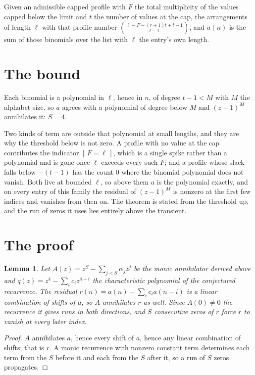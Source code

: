 \documentclass[11pt,a4paper]{article}
\theoremstyle{plain}
\newtheorem{lemma}[theorem]{Lemma}
\theoremstyle{definition}
\begin{document}
Given an admissible capped profile with $F$ the total multiplicity of the values capped below
the limit and $t$ the number of values at the cap, the arrangements of length $\ell$ with that
profile number $\binom{\ell-F-(r+1)t+t-1}{t-1}$, and $a(n)$ is the sum of those binomials
over the list with $\ell$ the entry's own length.

\section{The bound}

Each binomial is a polynomial in $\ell$, hence in $n$, of degree $t-1<M$ with $M$ the alphabet
size, so $a$ agrees with a polynomial of degree below $M$ and $(z-1)^{M}$ annihilates it:
$S=4$.

Two kinds of term are outside that polynomial at small lengths, and they are why the threshold
below is not zero. A profile with no value at the cap contributes the indicator
$[\,F=\ell\,]$, which is a single spike rather than a polynomial and is gone once
$\ell$ exceeds every such $F$; and a profile whose slack falls below $-(t-1)$ has the count
$0$ where the binomial polynomial does not vanish. Both live at bounded $\ell$, so above them
$a$ is the polynomial exactly, and on every entry of this family the residual of $(z-1)^{M}$
is nonzero at the first few indices and vanishes from then on. The theorem is stated from the
threshold up, and the run of zeros it uses lies entirely above the transient.

\section{The proof}

\begin{lemma}\label{lem:crit}
Let $A(z)=z^S-\sum_{j<S}\alpha_jz^{j}$ be the monic annihilator derived above and
$q(z)=z^{4}-\sum_ic_iz^{4-i}$ the characteristic polynomial of the conjectured
recurrence. The residual $r(n)=a(n)-\sum_ic_ia(n-i)$ is a linear combination of shifts of $a$,
so $A$ annihilates $r$ as well. Since $A(0)\ne0$ the recurrence it gives runs in both
directions, and $S$ consecutive zeros of $r$ force $r$ to vanish at every later index.
\end{lemma}

\begin{proof}
$A$ annihilates $a$, hence every shift of $a$, hence any linear combination of shifts; that is
$r$. A monic recurrence with nonzero constant term determines each term from the $S$ before it
and each from the $S$ after it, so a run of $S$ zeros propagates.
\end{proof}
\end{document}
